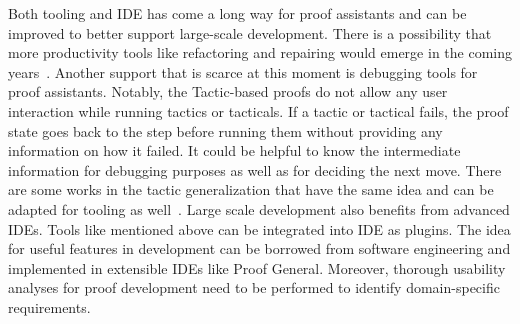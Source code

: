 Both tooling and IDE has come a long way for proof assistants and can be improved to better support large-scale development. There is a possibility that more productivity tools like refactoring and repairing would emerge in the coming years~\cite{Ringer_et_al_2019}. Another support that is scarce at this moment is debugging tools for proof assistants. Notably, the Tactic-based proofs do not allow any user interaction while running tactics or tacticals. If a tactic or tactical fails, the proof state goes back to the step before running them without providing any information on how it failed. It could be helpful to know the intermediate information for debugging purposes as well as for deciding the next move. There are some works in the tactic generalization that have the same idea and can be adapted for tooling as well~\cite{Felty_Howe_1994}. Large scale development also benefits from advanced IDEs. Tools like mentioned above can be integrated into IDE as plugins. The idea for useful features in development can be borrowed from software engineering and implemented in extensible IDEs like Proof General. Moreover, thorough usability analyses for proof development need to be performed to identify domain-specific requirements. 


